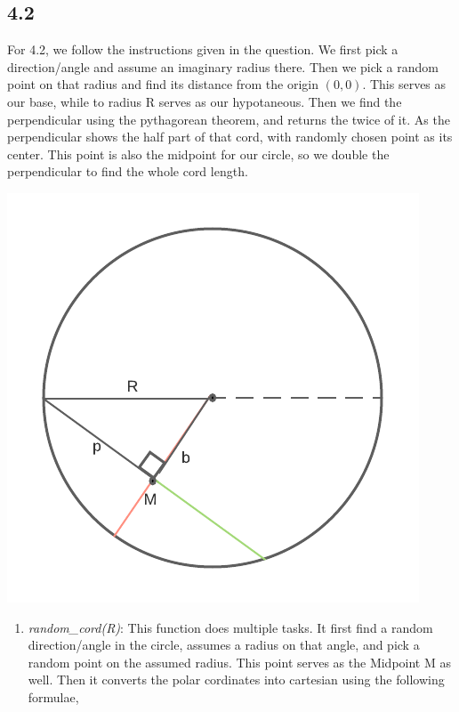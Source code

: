 \documentclass[answers]{exam}
\begin{document}
  \subsection*{4.2}
    \begin{framed}
        For 4.2, we follow the instructions given in the question. We first pick a direction/angle and assume an imaginary radius there. Then we pick a random point on that radius and find its distance from the origin $(0,0)$. This serves as our base, while to radius R serves as our hypotaneous. Then we find the perpendicular using the pythagorean theorem, and returns the twice of it. As the perpendicular shows the half part of that cord, with randomly chosen point as its center. This point is also the midpoint for our circle, so we double the perpendicular to find the whole cord length.
        \begin{center}
            \includegraphics[scale=0.7]{Q4/4.2_circle.png}
        \end{center}
        \begin{enumerate}
            \item \emph{random\_cord(R)}: This function does multiple tasks. It first find a random direction/angle in the circle, assumes a radius on that angle, and pick a random point on the assumed radius. This point serves as the Midpoint M as well. Then it converts the polar cordinates into cartesian using the following formulae,
                \begin{align*}

\end{align*}
\end{enumerate}
\end{framed}
\end{document}
